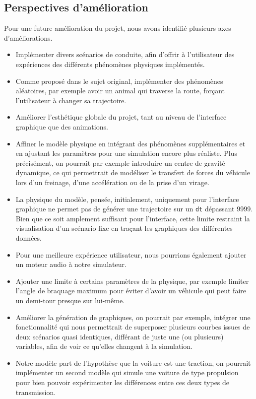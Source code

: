 \subsection{Perspectives d'amélioration}\label{subsec:perspectives-d'ameliorations}
Pour une future amélioration du projet, nous avons identifié plusieurs axes d'améliorations.
\begin{itemize}
    \item Implémenter divers scénarios de conduite, afin d'offrir à l'utilisateur des expériences des différents phénomènes physiques implémentés.
    \item Comme proposé dans le sujet original, implémenter des phénomènes aléatoires, par exemple avoir un animal qui traverse la route, forçant l'utilisateur à changer sa trajectoire.
    \item Améliorer l'esthétique globale du projet, tant au niveau de l'interface graphique que des animations.
    \item Affiner le modèle physique en intégrant des phénomènes supplémentaires et en ajustant les paramètres pour une simulation encore plus réaliste.
    Plus précisément, on pourrait par exemple introduire un centre de gravité dynamique, ce qui permettrait de modéliser le transfert de forces du véhicule lors d'un freinage, d'une accélération ou de la prise d'un virage.
    \item La physique du modèle, pensée, initialement, uniquement pour l'interface graphique ne permet pas de générer une trajectoire sur un \texttt{dt} dépassant 9999.
    Bien que ce soit amplement suffisant pour l'interface, cette limite restraint la visualisation d'un scénario fixe en traçant les graphiques des différentes données.
    \item Pour une meilleure expérience utilisateur, nous pourrions également ajouter un moteur audio à notre simulateur.
    \item Ajouter une limite à certains paramètres de la physique, par exemple limiter l'angle de braquage maximum pour éviter d'avoir un véhicule qui peut faire un demi-tour presque sur lui-même.
    \item Améliorer la génération de graphiques, on pourrait par exemple, intégrer une fonctionnalité qui nous permettrait de superposer plusieurs courbes issues de deux scénarios quasi identiques, différant de juste une (ou plusieurs) variables, afin de voir ce qu'elles changent à la simulation.
    \item Notre modèle part de l'hypothèse que la voiture est une traction, on pourrait implémenter un second modèle qui simule une voiture de type propulsion pour bien pouvoir expérimenter les différences entre ces deux types de transmission.

\end{itemize}

